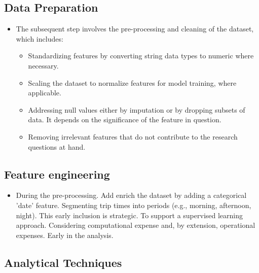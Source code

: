 \documentclass[12pt, a4paper]{article}
\begin{document}
     \subsection{Data Preparation}\label{subsec:data-preparation}
    \begin{itemize}
        \item The subsequent step involves the pre-processing and cleaning of the dataset, which includes:
        \begin{itemize}
            \item Standardizing features by converting string data types to numeric where necessary.
            \item Scaling the dataset to normalize features for model training, where applicable.
            \item Addressing null values either by imputation or by dropping subsets of data. It depends on the significance of the feature in question.
            \item Removing irrelevant features that do not contribute to the research questions at hand.
        \end{itemize}
    \end{itemize}

    \subsection{Feature engineering}\label{subsec:feature-engineering}
    \begin{itemize}
        \item During the pre-processing. Add enrich the dataset by adding a categorical 'date' feature.
        Segmenting trip times into periods (e.g., morning, afternoon, night). \newline This early inclusion is strategic.
        To  support a supervised learning approach. Considering  computational expense and, by extension, operational expenses. Early in the analysis.
    \end{itemize}
    \subsection{Analytical Techniques}\label{subsec:analytical-techniques}
\end{document}
